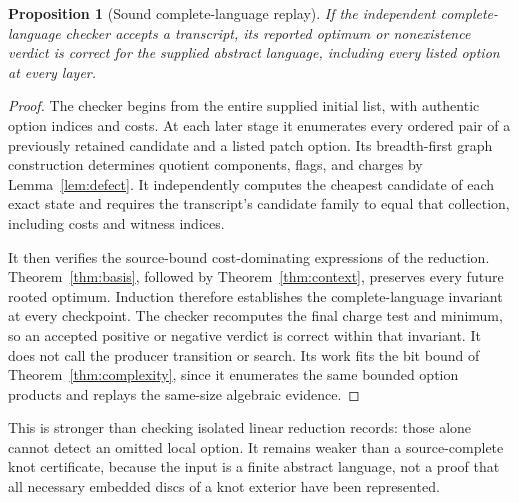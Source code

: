 \documentclass[11pt,letterpaper]{article}
\newtheorem{proposition}[theorem]{Proposition}
\theoremstyle{definition}
\begin{document}
\begin{proposition}[Sound complete-language replay]
If the independent complete-language checker accepts a transcript, its reported optimum or nonexistence verdict is correct for the supplied abstract language, including every listed option at every layer.
\end{proposition}
\begin{proof}
The checker begins from the entire supplied initial list, with authentic option indices and costs. At each later stage it enumerates every ordered pair of a previously retained candidate and a listed patch option. Its breadth-first graph construction determines quotient components, flags, and charges by Lemma~\ref{lem:defect}. It independently computes the cheapest candidate of each exact state and requires the transcript's candidate family to equal that collection, including costs and witness indices.

It then verifies the source-bound cost-dominating expressions of the reduction. Theorem~\ref{thm:basis}, followed by Theorem~\ref{thm:context}, preserves every future rooted optimum. Induction therefore establishes the complete-language invariant at every checkpoint. The checker recomputes the final charge test and minimum, so an accepted positive or negative verdict is correct within that invariant. It does not call the producer transition or search. Its work fits the bit bound of Theorem~\ref{thm:complexity}, since it enumerates the same bounded option products and replays the same-size algebraic evidence.
\end{proof}

This is stronger than checking isolated linear reduction records: those alone cannot detect an omitted local option. It remains weaker than a source-complete knot certificate, because the input is a finite abstract language, not a proof that all necessary embedded discs of a knot exterior have been represented.
\end{document}
